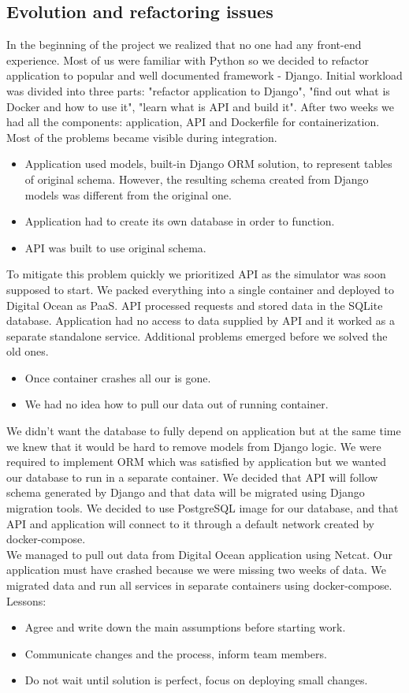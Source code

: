 \documentclass{article}
\begin{document}
\subsection{Evolution and refactoring issues}
In the beginning of the project we realized that no one had any front-end experience. Most of us were familiar with Python so we decided to refactor application to popular and well documented framework - Django. Initial workload was divided into three parts: "refactor application to Django", "find out what is Docker and how to use it", "learn what is API and build it". After two weeks we had all the components: application, API and Dockerfile for containerization. Most of the problems became visible during integration.
\begin{itemize}
    \item Application used models, built-in Django ORM solution, to represent tables of original schema. However, the resulting schema created from Django models was different from the original one.
    \item Application had to create its own database in order to function.
    \item API was built to use original schema.
\end{itemize}
To mitigate this problem quickly we prioritized API as the simulator was soon supposed to start. We packed everything into a single container and deployed to Digital Ocean as PaaS. API processed requests and stored data in the SQLite database. Application had no access to data supplied by API and it worked as a separate standalone service. Additional problems emerged before we solved the old ones. 
\begin{itemize}
    \item Once container crashes all our is gone.
    \item We had no idea how to pull our data out of running container.
\end{itemize}
We didn't want the database to fully depend on application but at the same time we knew that it would be hard to remove models from Django logic. We were required to implement ORM which was satisfied by application but we wanted our database to run in a separate container. We decided that API will follow schema generated by Django and that data will be migrated using Django migration tools. We decided to use PostgreSQL image for our database, and that API and application will connect to it through a default network created by docker-compose.
\\
We managed to pull out data from Digital Ocean application using Netcat. Our application must have crashed because we were missing two weeks of data. We migrated data and run all services in separate containers using docker-compose.
\\
Lessons:
\begin{itemize}
    \item Agree and write down the main assumptions before starting work.
    \item Communicate changes and the process, inform team members.
    \item Do not wait until solution is perfect, focus on deploying small changes.
\end{itemize}
\end{document}
